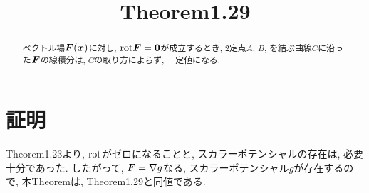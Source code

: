 \documentclass{jsarticle} \usepackage[dvipdfmx]{graphicx} \usepackage[dvipdfmx]{hyperref}
\title{Theorem1.29}
\newcommand*{\mbold}[1]{\mbox{\boldmath $#1$}}
\newcommand*{\rot}{{\rm rot}}
\begin{document}
\maketitle

\begin{abstract}
  ベクトル場$\mbold{F}(\mbold{x})$に対し, $\rot\mbold{F} = \mbold{0}$が成立するとき, 
  2定点$A$, $B$, を結ぶ曲線$C$に沿った$\mbold{F}$の線積分は, $C$の取り方によらず, 一定値になる.  
\end{abstract}

\section*{証明}
Theorem1.23より, $\rot$がゼロになることと, スカラーポテンシャルの存在は, 必要十分であった. したがって, 
$\mbold{F} = \nabla g$なる, スカラーポテンシャル$g$が存在するので, 本Theoremは, Theorem1.29と同値である. 
\end{document}
